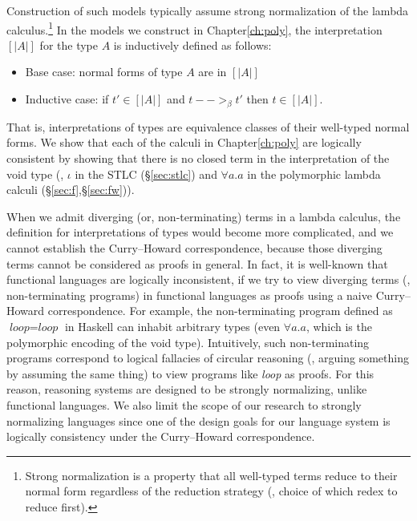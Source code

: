 Construction of such models typically assume strong normalization of
the lambda calculus.\footnote{Strong normalization is a property that
all well-typed terms reduce to their normal form regardless of
the reduction strategy (\ie, choice of which redex to reduce first).}
In the models we construct in Chapter\;\ref{ch:poly},
the interpretation $[| A |]$ for the type $A$ is inductively defined as follows:
\begin{itemize}
        \item Base case: normal forms of type $A$ are in $[| A |]$
        \item Inductive case: if $t' \in [| A |]$ and $t -->_\beta t'$
                then $t \in [| A |]$.
\end{itemize}
That is, interpretations of types are equivalence classes of their
well-typed normal forms.
We show that each of the calculi in Chapter\;\ref{ch:poly} are
logically consistent by showing that there is no closed term
in the interpretation of the void type
(\ie, $\iota$ in the STLC (\S\ref{sec:stlc}) and $\forall a.a$ in
the polymorphic lambda calculi (\S\ref{sec:f},\S\ref{sec:fw})).

When we admit diverging (or, non-terminating) terms in a lambda calculus,
the definition for interpretations of types would become more complicated,
and we cannot establish the Curry--Howard correspondence, because those
diverging terms cannot be considered as proofs in general. In fact,
it is well-known that functional languages are logically inconsistent,
if we try to view diverging terms (\ie, non-terminating programs)
in functional languages as proofs using a naive Curry--Howard correspondence.
For example, the non-terminating program defined as
$\textit{loop} = \textit{loop}$ in Haskell can inhabit arbitrary types
(even $\forall a.a$, which is the polymorphic encoding of the void type).
Intuitively, such non-terminating programs correspond to logical fallacies of
circular reasoning (\ie, arguing something by assuming the same thing)
to view programs like \textit{loop} as proofs. For this reason,
reasoning systems are designed to be strongly normalizing, unlike
functional languages. We also limit the scope of our research to
strongly normalizing languages since one of the design goals for our language
system is logically consistency under the Curry--Howard correspondence.


